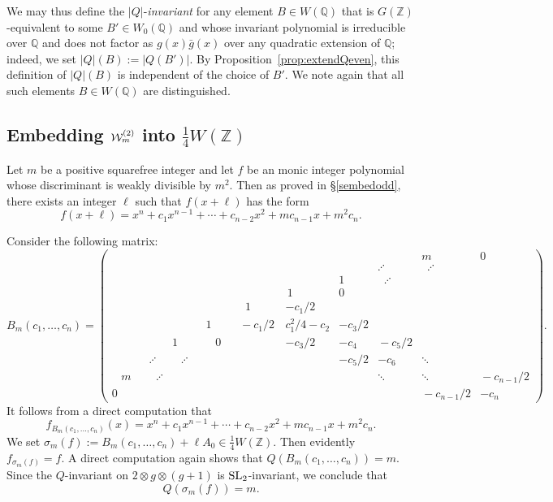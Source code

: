 \documentclass[11pt]{article}
\def\Z{{\mathbb Z}}
\def\SL{{\rm SL}}
\def\Q{{\mathbb Q}}
\def\U{{\mathcal W}}
\def\Z{{\mathbb Z}}
\def\Q{{\mathbb Q}}
\def\w{{\rm {(2)}}}
\begin{document}
We may thus define the $|Q|$-{\it invariant} for any element $B\in W(\Q)$ that is $G(\Z)$-equivalent to some $B'\in W_0(\Q)$ and whose invariant polynomial is irreducible over $\Q$ and does not factor as $g(x)\bar{g}(x)$ over any quadratic extension of $\Q$; indeed, we set $|Q|(B):=|Q(B')|$. By Proposition~\ref{prop:extendQeven}, this definition of $|Q|(B)$ is independent of  the choice of $B'$. We note again that all such elements $B\in W(\Q)$ are distinguished.

\subsection{Embedding $\U_m^\w$ into $\frac14W(\Z)$}\label{sembedeven}

Let $m$ be a positive squarefree integer and let $f$ be an monic
integer polynomial whose discriminant is weakly divisible by
$m^2$. Then as proved in \S\ref{sembedodd}, there exists an integer
$\ell$ such that $f(x+\ell)$ has the form
$$f(x+\ell) = x^n + c_1x^{n-1} + \cdots + c_{n-2}x^2 + mc_{n-1}x + m^2c_n.$$



Consider the following matrix:
\begin{equation}\label{mat2}
 B_m(c_1,\ldots,c_n) =
 \left(\!\!\!\!\!\begin{array}{cccccccccc}&&&&&&&&m&0\\[.065in]&&&&&&&\iddots&\:\;\iddots& \\[.025in]&&&&&&1&\;\;\iddots&&\\[.185in] &&&&&\,1&0&&&\\[.185in] &&&&\:\;1\;&-c_1/2&&&& \\[.175in]&&&1&\!\!-c_1/2\,&\!\!c_1^2/4\!-\!c_2\!\!&-c_3/2&&&\\[.175in]&&1&\;\;\;0\;\;\;&&-c_3/2&-c_4&\!\!\!-c_5/2\!\!\!&&\\[.085in]&\iddots&\;\;\:\iddots\:\;\;&&&&-c_5/2&-c_6&\ddots&\\[.0125in] \;\;\;m\;\;\:&\;\,\,\iddots&&&&&&\ddots&\ddots&\!\!-c_{n-1}/2\!\!
   \\[.125in] 0&&&&&&&&\!\!\!\!-c_{n-1}/2\!\!\!\!&-c_n \end{array}\!\right).
\end{equation}
It follows from a direct computation that
$$f_{B_m(c_1,\ldots,c_n)}(x) = x^n + c_1x^{n-1} + \cdots + c_{n-2}x^2 +
mc_{n-1}x + m^2c_n.$$ We set $\sigma_m(f) := B_m(c_1,\ldots,c_n) +
\ell A_0\in \frac14 W(\Z)$. Then evidently $f_{\sigma_m(f)}=f.$ A direct computation again shows that
$Q(B_m(c_1,\ldots,c_n))=m$. Since the $Q$-invariant on $2\otimes
g\otimes (g+1)$ is $\SL_2$-invariant, we conclude
that $$Q(\sigma_m(f))=m.$$
\end{document}

